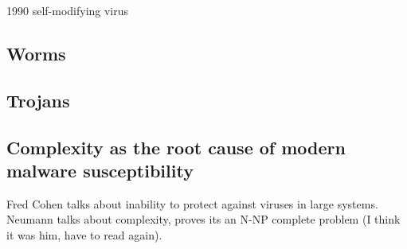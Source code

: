 1990 self-modifying virus

\subsection{Worms}


\subsection{Trojans}


\subsection{Complexity as the root cause of modern malware susceptibility}
Fred Cohen talks about inability to protect against viruses in large systems.
Neumann talks about complexity, proves its an N-NP complete problem (I think it was him, have to read again).
